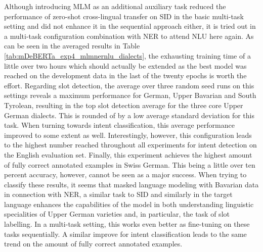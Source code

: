 \documentclass[11pt,a4paper,twoside,openright]{scrbook}
\begin{document}
Although introducing MLM as an additional auxiliary task reduced the performance of zero-shot cross-lingual transfer on SID in the basic multi-task setting and did not enhance it in the sequential approach either, it is tried out in a multi-task configuration combination with NER to attend NLU here again. As can be seen in the averaged results in Table \ref{tab:mDeBERTa_exp4_mlmnernlu_dialects}, the exhausting training time of a little over two hours which should actually be extended as the best model was reached on the development data in the last of the twenty epochs is worth the effort. Regarding slot detection, the average over three random seed runs on this settings reveals a maximum performance for German, Upper Bavarian and South Tyrolean, resulting in the top slot detection average for the three core Upper German dialects. This is rounded of by a low average standard deviation for this task. When turning towards intent classification, this average performance improved to some extent as well. Interestingly, however, this configuration leads to the highest number reached throughout all experiments for intent detection on the English evaluation set. Finally, this experiment achieves the highest amount of fully correct annotated examples in Swiss German. This being a little over ten percent accuracy, however, cannot be seen as a major success. When trying to classify these results, it seems that masked language modeling with Bavarian data in connection with NER, a similar task to SID and similarly in the target language enhances the capabilities of the model in both understanding linguistic specialities of Upper German varieties and, in particular, the task of slot labelling. In a multi-task setting, this works even better as fine-tuning on these tasks sequentially. A similar improve for intent classification leads to the same trend on the amount of fully correct annotated examples.
\end{document}
